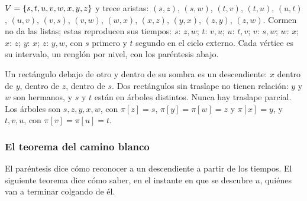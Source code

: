 \documentclass[11pt,letterpaper]{article}
\begin{document}
\begin{ejemplo}
  \label{ej:busq-fig225}
  $V = \left\{ s, t, u, v, w, x, y, z \right\}$ y trece aristas: $(s,z)$,
  $(s,w)$, $(t,v)$, $(t,u)$, $(u,t)$, $(u,v)$, $(v,s)$, $(v,w)$,
  $(w,x)$, $(x,z)$, $(y,x)$, $(z,y)$, $(z,w)$. Cormen no da las
  listas; estas reproducen sus tiempos: $s$: $z, w$; $t$: $v, u$;
  $u$: $t, v$; $v$: $s, w$; $w$: $x$; $x$: $z$; $y$: $x$; $z$: $y, w$,
  con $s$ primero y $t$ segundo en el ciclo externo. Cada vértice es
  su intervalo, un renglón por nivel, con los paréntesis abajo.
  \begin{center}
  \end{center}
  Un rectángulo debajo de otro y dentro de su sombra es un
  descendiente: $x$ dentro de $y$, dentro de $z$, dentro de $s$. Dos
  rectángulos sin traslape no tienen relación: $y$ y $w$ son hermanos,
  y $s$ y $t$ están en árboles distintos. Nunca hay traslape parcial.
  Los árboles son $s, z, y, x, w$, con $\pi[z] = s$,
  $\pi[y] = \pi[w] = z$ y $\pi[x] = y$, y $t, v, u$, con
  $\pi[v] = \pi[u] = t$.
\end{ejemplo}

\subsubsection*{El teorema del camino blanco}

El paréntesis dice cómo reconocer a un descendiente a partir de los
tiempos. El siguiente teorema dice cómo saber, en el instante en que
se descubre $u$, quiénes van a terminar colgando de él.
\end{document}
